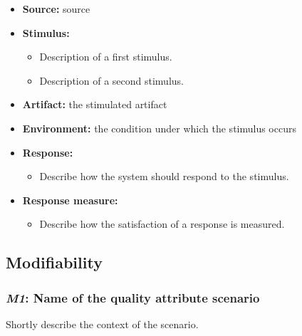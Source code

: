 \documentclass[a4paper,10pt]{article}
\begin{document}
\begin{itemize}
    \item \textbf{Source:} source
    \item \textbf{Stimulus:}
        \begin{itemize}
            \item Description of a first stimulus.
            \item Description of a second stimulus.
        \end{itemize}

    \item \textbf{Artifact:} the stimulated artifact
    \item \textbf{Environment:} the condition under which the stimulus occurs
    \item \textbf{Response:}
        \begin{itemize}
            \item Describe how the system should respond to the stimulus.
        \end{itemize}

    \item \textbf{Response measure:}
        \begin{itemize}
            \item Describe how the satisfaction of a response is measured.
        \end{itemize}
\end{itemize}

\subsection{Modifiability}
\subsubsection{\emph{M1}: Name of the quality attribute scenario}
Shortly describe the context of the scenario.
\end{document}
